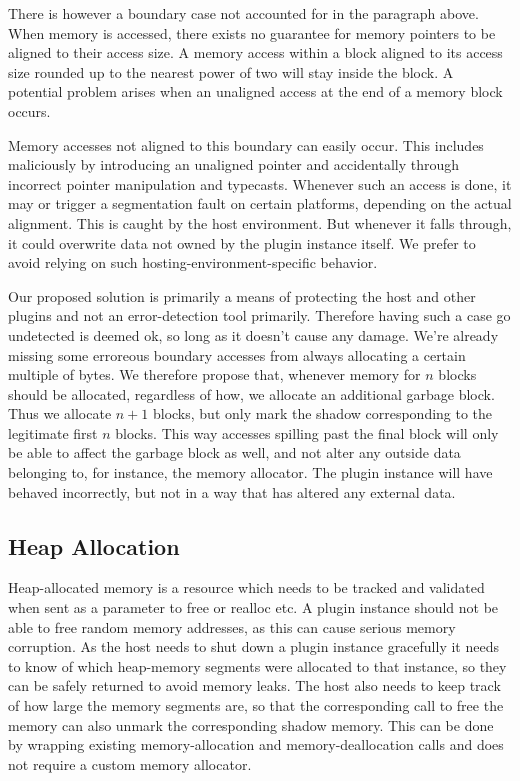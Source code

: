 There is however a boundary case not accounted for in the paragraph above. When
memory is accessed, there exists no guarantee for memory pointers to be aligned
to their access size. A memory access within a block aligned to its access size
rounded up to the nearest power of two will stay inside the block. A potential
problem arises when an unaligned access at the end of a memory block occurs.

Memory accesses not aligned to this boundary can easily occur. This includes
maliciously by introducing an unaligned pointer and accidentally through
incorrect pointer manipulation and typecasts. Whenever such an access is done,
it may or trigger a segmentation fault on certain platforms, depending on the
actual alignment. This is caught by the host environment. But whenever it falls
through, it could overwrite data not owned by the plugin instance itself. We
prefer to avoid relying on such hosting-environment-specific behavior.

Our proposed solution is primarily a means of protecting the host and other
plugins and not an error-detection tool primarily. Therefore having such a case
go undetected is deemed ok, so long as it doesn't cause any damage. We're
already missing some erroreous boundary accesses from always allocating a
certain multiple of bytes. We therefore propose that, whenever memory for $n$
blocks should be allocated, regardless of how, we allocate an additional garbage
block. Thus we allocate $n+1$ blocks, but only mark the shadow corresponding to
the legitimate first $n$ blocks. This way accesses spilling past the final
block will only be able to affect the garbage block as well, and not alter any
outside data belonging to, for instance, the memory allocator. The plugin
instance will have behaved incorrectly, but not in a way that has altered any
external data.

\subsection {Heap Allocation}

Heap-allocated memory is a resource which needs to be tracked and validated when
sent as a parameter to free or realloc etc. A plugin instance should not be able
to free random memory addresses, as this can cause serious memory corruption. As
the host needs to shut down a plugin instance gracefully it needs to know of
which heap-memory segments were allocated to that instance, so they can be
safely returned to avoid memory leaks. The host also needs to keep track of how
large the memory segments are, so that the corresponding call to free the memory
can also unmark the corresponding shadow memory. This can be done by wrapping
existing memory-allocation and memory-deallocation calls and does not require a
custom memory allocator.

